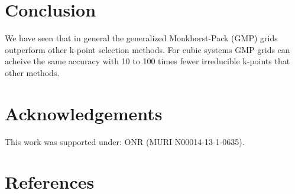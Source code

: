 \documentclass[12pt,prb,reprint]{revtex4-1}
\begin{document}




\section{Conclusion} \label{conclusion}

We have seen that in general the generalized Monkhorst-Pack (GMP)
grids outperform other k-point selection methods. For cubic systems
GMP grids can acheive the same accuracy with 10 to 100 times fewer
irreducible k-points that other methods. %

\section{Acknowledgements}
This work was supported under: ONR (MURI N00014-13-1-0635).

\section{References}



\end{document}
